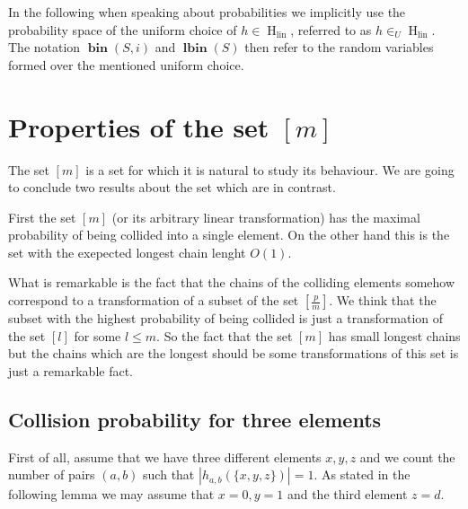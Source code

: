 \documentclass{article}
\newcommand{\hlin}{\operatorname{H}_{\operatorname{lin}}}
\newcommand{\vbin}[2]{\operatorname{\mathbf{bin}}({#1}, {#2})}
\newcommand{\vlbin}[1]{\operatorname{\mathbf{lbin}}({#1})}
\newcommand{\inu}{\in_U}
\begin{document}
In the following when speaking about probabilities we implicitly use the probability space of the uniform choice of $h \in \hlin$, referred to as $h \inu \hlin$.
The notation $\vbin{S}{i}$ and $\vlbin{S}$ then refer to the random variables formed over the mentioned uniform choice.

\section{Properties of the set $[m]$}

The set $[m]$ is a set for which it is natural to study its behaviour.
We are going to conclude two results about the set which are in contrast.

First the set $[m]$ (or its arbitrary linear transformation) has the maximal probability of being collided into a single element.
On the other hand this is the set with the exepected longest chain lenght $O(1)$.

What is remarkable is the fact that the chains of the colliding elements somehow correspond to a transformation of a subset of the set $[\frac{p}{m}]$.
We think that the subset with the highest probability of being collided is just a transformation of the set $[l]$ for some $l \leq m$.
So the fact that the set $[m]$ has small longest chains but the chains which are the longest should be some transformations of this set is just a remarkable fact.

\subsection{Collision probability for three elements}

First of all, assume that we have three different elements $x, y, z$ and we count the number of pairs $(a, b)$ such that $|h_{a, b}(\{x, y, z\})| = 1$.
As stated in the following lemma we may assume that $x = 0, y = 1$ and the third element $z = d$.
\end{document}
